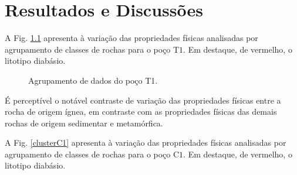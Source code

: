 \chapter{Resultados e Discussões}

A Fig. \ref{clusterT1} apresenta à variação das propriedades físicas analisadas por agrupamento de classes de rochas para o poço T$1$. Em destaque, de vermelho, o litotipo diabásio. 

\begin{figure}[H]
	\centering
	\setlength{\fboxsep}{8pt}
	\setlength{\fboxrule}{0.1pt}
	\caption{Agrupamento de dados do poço T1.}
	\label{clusterT1}
\end{figure} 

É perceptível o notável contraste de variação das propriedades físicas entre a rocha de origem ígnea, em contraste com as propriedades físicas das demais rochas de origem sedimentar e metamórfica. 

A Fig. \ref{clusterC1} apresenta à variação das propriedades físicas analisadas por agrupamento de classes de rochas para o poço C$1$. Em destaque, de vermelho, o litotipo diabásio. 

